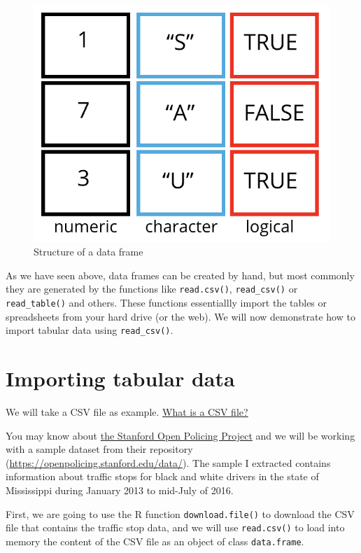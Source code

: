 \documentclass[
]{book}
\begin{document}
\begin{figure}
\includegraphics[width=0.8\linewidth]{img/data-frame} \caption{Structure of a data frame}\label{fig:data-frame}
\end{figure}

As we have seen above, data frames can be created by hand, but most commonly they are generated by the functions like \texttt{read.csv()}, \texttt{read\_csv()} or \texttt{read\_table()} and others. These functions essentiallly import the tables or spreadsheets from your hard drive (or the web). We will now demonstrate how to import tabular data using \texttt{read\_csv()}.

\hypertarget{importing-tabular-data}{%
\section{Importing tabular data}\label{importing-tabular-data}}

We will take a CSV file as example. \href{https://support.bigcommerce.com/articles/Public/What-is-a-CSV-file-and-how-do-I-save-my-spreadsheet-as-one}{What is a CSV file?}

You may know about \href{https://openpolicing.stanford.edu}{the Stanford Open Policing Project} and we will be working with a sample dataset from their repository (\url{https://openpolicing.stanford.edu/data/}). The sample I extracted contains information about traffic stops for black and white drivers in the state of Mississippi during January 2013 to mid-July of 2016.

First, we are going to use the R function \texttt{download.file()} to download the CSV file
that contains the traffic stop data, and we will use \texttt{read.csv()} to
load into memory the content of the CSV file as an object of class \texttt{data.frame}.
\end{document}
